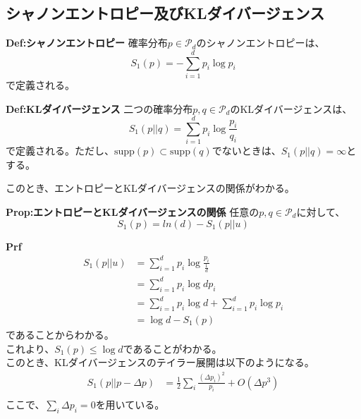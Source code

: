 \documentclass[a4paper,11pt]{jsarticle}
\numberwithin{equation}{section}
\begin{document}
\subsection{シャノンエントロピー及びKLダイバージェンス}
\begin{itembox}[l]{\textbf{Def:シャノンエントロピー}}
    確率分布$p \in \mathcal{P}_d$のシャノンエントロピーは、
    \begin{equation}
        S_1(p) = -\sum_{i=1}^{d}p_i\log p_i
    \end{equation}
    で定義される。
\end{itembox}
\begin{itembox}[l]{\textbf{Def:KLダイバージェンス}}
    二つの確率分布$p, q \in \mathcal{P}_d$のKLダイバージェンスは、
    \begin{equation}
        S_1(p||q) = \sum_{i=1}^{d}p_i\log\frac{p_i}{q_i}
    \end{equation}
    で定義される。ただし、$\text{supp}(p) \subset \text{supp}(q)$でないときは、$S_1(p||q) = \infty$とする。
\end{itembox}
このとき、エントロピーとKLダイバージェンスの関係がわかる。
\begin{itembox}[l]{\textbf{Prop:エントロピーとKLダイバージェンスの関係}}
    任意の$p, q \in \mathcal{P}_d$に対して、
    \begin{equation}
        S_1(p) = ln(d) - S_1(p||u)
    \end{equation}
\end{itembox}
\textbf{Prf}\\
\begin{align}
    S_1(p||u) &= \sum_{i=1}^{d}p_i\log\frac{p_i}{\frac{1}{d}}\\
    &= \sum_{i=1}^{d}p_i\log dp_i\\
    &= \sum_{i=1}^{d}p_i\log d + \sum_{i=1}^{d}p_i\log p_i\\
    &= \log d - S_1(p)
\end{align}
であることからわかる。\hfill \qedsymbol\\
これより、$S_1(p) \leq \log d$であることがわかる。\\
このとき、KLダイバージェンスのテイラー展開は以下のようになる。
\begin{align}
    S_1(p||p-\Delta p) &= \frac{1}{2}\sum_i \frac{(\Delta p_i)^2}{p_i} + O(\Delta p^3)\\
\end{align}
ここで、$\sum_i \Delta p_i = 0$を用いている。\\
\end{document}
